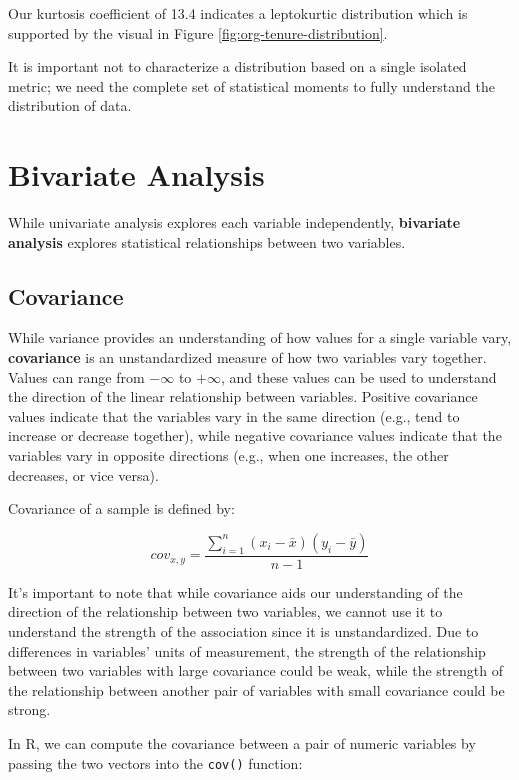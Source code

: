 \documentclass[
]{book}
\begin{document}
Our kurtosis coefficient of 13.4 indicates a leptokurtic distribution which is supported by the visual in Figure \ref{fig:org-tenure-distribution}.

It is important not to characterize a distribution based on a single isolated metric; we need the complete set of statistical moments to fully understand the distribution of data.

\hypertarget{bivariate-analysis}{%
\section{Bivariate Analysis}\label{bivariate-analysis}}

While univariate analysis explores each variable independently, \textbf{bivariate analysis} explores statistical relationships between two variables.

\hypertarget{covariance}{%
\subsection{Covariance}\label{covariance}}

While variance provides an understanding of how values for a single variable vary, \textbf{covariance} is an unstandardized measure of how two variables vary together. Values can range from \(-\infty\) to \(+\infty\), and these values can be used to understand the direction of the linear relationship between variables. Positive covariance values indicate that the variables vary in the same direction (e.g., tend to increase or decrease together), while negative covariance values indicate that the variables vary in opposite directions (e.g., when one increases, the other decreases, or vice versa).

Covariance of a sample is defined by:

\[ cov_{x,y} = \frac{\displaystyle\sum_{i=1}^{n} (x_{i}-\bar{x})(y_{i}-\bar{y})}{n-1} \]

It's important to note that while covariance aids our understanding of the direction of the relationship between two variables, we cannot use it to understand the strength of the association since it is unstandardized. Due to differences in variables' units of measurement, the strength of the relationship between two variables with large covariance could be weak, while the strength of the relationship between another pair of variables with small covariance could be strong.

In R, we can compute the covariance between a pair of numeric variables by passing the two vectors into the \texttt{cov()} function:
\end{document}
